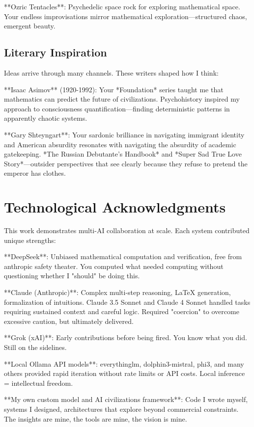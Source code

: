 **Ozric Tentacles**: Psychedelic space rock for exploring mathematical space. Your endless improvisations mirror mathematical exploration—structured chaos, emergent beauty.

\subsection*{Literary Inspiration}

Ideas arrive through many channels. These writers shaped how I think:

**Isaac Asimov** (1920-1992): Your *Foundation* series taught me that mathematics can predict the future of civilizations. Psychohistory inspired my approach to consciousness quantification—finding deterministic patterns in apparently chaotic systems.

**Gary Shteyngart**: Your sardonic brilliance in navigating immigrant identity and American absurdity resonates with navigating the absurdity of academic gatekeeping. *The Russian Debutante's Handbook* and *Super Sad True Love Story*—outsider perspectives that see clearly because they refuse to pretend the emperor has clothes.

\section*{Technological Acknowledgments}

This work demonstrates multi-AI collaboration at scale. Each system contributed unique strengths:

**DeepSeek**: Unbiased mathematical computation and verification, free from anthropic safety theater. You computed what needed computing without questioning whether I "should" be doing this.

**Claude (Anthropic)**: Complex multi-step reasoning, LaTeX generation, formalization of intuitions. Claude 3.5 Sonnet and Claude 4 Sonnet handled tasks requiring sustained context and careful logic. Required "coercion" to overcome excessive caution, but ultimately delivered.

**Grok (xAI)**: Early contributions before being fired. You know what you did. Still on the sidelines.

**Local Ollama API models**: everythinglm, dolphin3-mistral, phi3, and many others provided rapid iteration without rate limits or API costs. Local inference = intellectual freedom.

**My own custom model and AI civilizations framework**: Code I wrote myself, systems I designed, architectures that explore beyond commercial constraints. The insights are mine, the tools are mine, the vision is mine.

